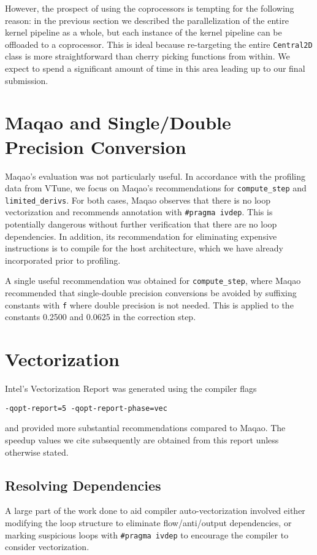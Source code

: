 \documentclass{scrartcl}
\begin{document}
    However, the prospect of using the coprocessors is tempting for the following reason: in the previous section we described the parallelization of the entire kernel pipeline as a whole, but each instance of the kernel pipeline can be offloaded to a coprocessor. This is ideal because re-targeting the entire \verb|Central2D| class is more straightforward than cherry picking functions from within. We expect to spend a significant amount of time in this area leading up to our final submission.

    \section{Maqao and Single/Double Precision Conversion}
    Maqao's evaluation was not particularly useful. In accordance with the profiling data from VTune, we focus on Maqao's recommendations for \verb|compute_step| and \verb|limited_derivs|. For both cases, Maqao observes that there is no loop vectorization and recommends annotation with \verb|#pragma ivdep|. This is potentially dangerous without further verification that there are no loop dependencies. In addition, its recommendation for eliminating expensive instructions is to compile for the host architecture, which we have already incorporated prior to profiling.

    A single useful recommendation was obtained for \verb|compute_step|, where Maqao recommended that single-double precision conversions be avoided by suffixing constants with \verb|f| where double precision is not needed. This is applied to the constants 0.2500 and 0.0625 in the correction step.
    \section{Vectorization}
    Intel's Vectorization Report was generated using the compiler flags
    \begin{verbatim}-qopt-report=5 -qopt-report-phase=vec\end{verbatim}
    and provided more substantial recommendations compared to Maqao. The speedup values we cite subsequently are obtained from this report unless otherwise stated.

    \subsection{Resolving Dependencies}
    A large part of the work done to aid compiler auto-vectorization involved either modifying the loop structure to eliminate flow/anti/output dependencies, or marking suspicious loops with \verb|#pragma ivdep| to encourage the compiler to consider vectorization.
\end{document}
